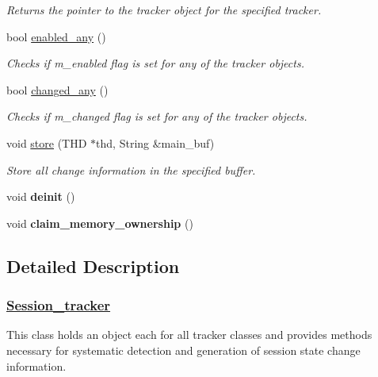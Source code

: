 \begin{DoxyCompactItemize}
\begin{DoxyCompactList}\small\item\em Returns the pointer to the tracker object for the specified tracker. \end{DoxyCompactList}\item 
bool \mbox{\hyperlink{classSession__tracker_a7a754beda4f780ce535a3ea201155b29}{enabled\+\_\+any}} ()
\begin{DoxyCompactList}\small\item\em Checks if m\+\_\+enabled flag is set for any of the tracker objects. \end{DoxyCompactList}\item 
bool \mbox{\hyperlink{classSession__tracker_a603b8cbe6094c55ea9c25a2e60f9d52b}{changed\+\_\+any}} ()
\begin{DoxyCompactList}\small\item\em Checks if m\+\_\+changed flag is set for any of the tracker objects. \end{DoxyCompactList}\item 
void \mbox{\hyperlink{classSession__tracker_ac0a967ff6aac07ea844b322abfa1b8de}{store}} (T\+HD $\ast$thd, String \&main\+\_\+buf)
\begin{DoxyCompactList}\small\item\em Store all change information in the specified buffer. \end{DoxyCompactList}\item 
\mbox{\label{classSession__tracker_a089ec631401d15a5726dc57ddc096cf9}} 
void {\bfseries deinit} ()
\item 
\mbox{\label{classSession__tracker_a969a0bba42650752328a8004a0e9d290}} 
void {\bfseries claim\+\_\+memory\+\_\+ownership} ()
\end{DoxyCompactItemize}


\subsection{Detailed Description}
\subsubsection*{\mbox{\hyperlink{classSession__tracker}{Session\+\_\+tracker}} }

This class holds an object each for all tracker classes and provides methods necessary for systematic detection and generation of session state change information. 

